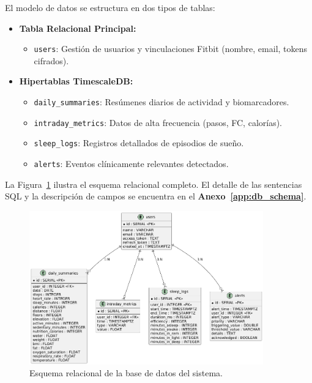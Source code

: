 El modelo de datos se estructura en dos tipos de tablas:

\begin{itemize}
    \item \textbf{Tabla Relacional Principal:}
        \begin{itemize}
            \item \texttt{users}: Gestión de usuarios y vinculaciones Fitbit (nombre, email, tokens cifrados).
        \end{itemize}
    \item \textbf{Hipertablas TimescaleDB:}
        \begin{itemize}
            \item \texttt{daily\_summaries}: Resúmenes diarios de actividad y biomarcadores.
            \item \texttt{intraday\_metrics}: Datos de alta frecuencia (pasos, FC, calorías).
            \item \texttt{sleep\_logs}: Registros detallados de episodios de sueño.
            \item \texttt{alerts}: Eventos clínicamente relevantes detectados.
        \end{itemize}
\end{itemize}

La Figura~\ref{fig:esquema_relacional} ilustra el esquema relacional completo. El detalle de las sentencias SQL y la descripción de campos se encuentra en el \textbf{Anexo~\ref{app:db_schema}}.

\begin{figure}[htbp]
    \centering
    \includegraphics[width=0.9\textwidth]{imagenes/esquema_relacional.png}
    \caption{Esquema relacional de la base de datos del sistema.}
    \label{fig:esquema_relacional}
\end{figure}

